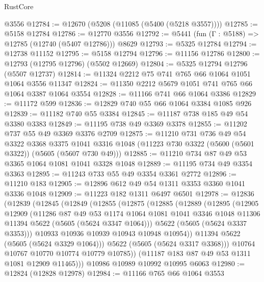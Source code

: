 \begin{lexlean}{RustCore}
\begin{coremodule}
    @3556
@12784 := @12670 (@5208 (@11085 (@5400 (@5218 @3557))))
@12785 := @5158 @12784
@12786 := @12770 @3556
@12792 := @5441 (fun (Γ : @5188) => @12785 (@12740 (@5407 @12786))) @8629
@12793 := @5325 @12784
@12794 := @12738 @11152
@12795 := @5158 @12794
@12796 := @11156 @12786
@12800 := @12793 (@12795 @12796) (@5502 @12669)
@12804 := @5325 @12794 @12796 (@5507 @12737)
@12814 := @11324 @2212 @75 @741 @765 @66 @1064 @1051 @1064 @3556 @11347
@12824 := @11350 @2212 @5679 @1051 @741 @765 @66 @1064 @3387 @1064 @3554
@12828 := @11166 @741 @66 @1064 @3386
@12829 := @11172 @599
@12836 := @12829 @740 @55 @66 @1064 @3384 @1085 @926
@12839 := @11182 @740 @55 @3384
@12845 := @11187 @738 @185 @49 @54 @3380 @3383
@12849 := @11195 @738 @49 @3369 @3378
@12855 := @11202 @737 @55 @49 @3369 @3376 @2709
@12875 := @11210
    @731
    @736
    @49
    @54
    @3322
    @3368
    @3375
    @1041
    @3316
    @1048
    (@11223 @730 @3322 (@5600 (@5601 @3322)) (@5605 (@5607 @730 @49)))
@12885 := @11210 @734 @87 @49 @53 @3365 @1064 @1081 @1041 @3328 @1048
@12889 := @11195 @734 @49 @3354 @3363
@12895 := @11243 @733 @55 @49 @3354 @3361 @2772
@12896 := @11210 @183
@12905 := @12896 @612 @49 @54 @1311 @3353 @3360 @1041 @3336 @1048
@12909 := @11223 @182 @1311 @6497 @6501
@12978 := @12836
    (@12839
      (@12845
        (@12849
          (@12855
            (@12875
              (@12885
                (@12889
                  (@12895
                    (@12905
                      @12909
                      (@11286
                        @87
                        @49
                        @53
                        @1174
                        @1064
                        @1081
                        @1041
                        @3346
                        @1048
                        @11306
                        @11394
                        @5622
                        (@5605 (@5624 @3347 @1064)))
                      @5622
                      (@5605 (@5624 @3337 @3353)))
                    @10933
                    @10936
                    @10939
                    @10943
                    @10948
                    @10954))
                @11394
                @5622
                (@5605 (@5624 @3329 @1064)))
              @5622
              (@5605 (@5624 @3317 @3368)))
            @10764
            @10767
            @10770
            @10774
            @10779
            @10785))
        (@11187 @183 @87 @49 @53 @1311 @1081 @12909 @11465)))
    @10986
    @10989
    @10992
    @10995
    @6063
@12980 := @12824 (@12828 @12978)
@12984 := @11166 @765 @66 @1064 @3553

\end{coremodule}
\end{lexlean}
